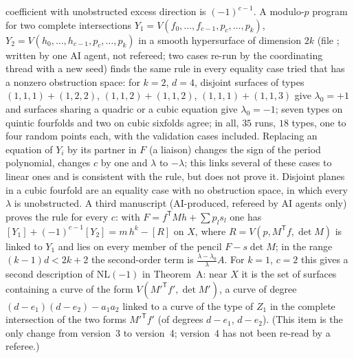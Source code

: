 \documentclass[11pt]{article}
\numberwithin{equation}{section}
\theoremstyle{remark}
\newcommand{\NL}{\mathrm{NL}}
\begin{document}
\begin{enumerate}[label=\textup{(\arabic*)}]
coefficient with unobstructed excess direction is $(-1)^{c-1}$. A modulo-$p$ program for two complete
intersections $Y_1=V(f_0,\dots,f_{c-1},p_c,\dots,p_k)$, $Y_2=V(h_0,\dots,h_{c-1},p_c,\dots,p_k)$ in a smooth
hypersurface of dimension $2k$ (file ; written by one AI agent, not refereed; two
cases re-run by the coordinating thread with a new seed) finds the same rule in every equality case tried that
has a nonzero obstruction space: for $k=2$, $d=4$, disjoint surfaces of types $(1,1,1)+(1,2,2)$,
$(1,1,2)+(1,1,2)$, $(1,1,1)+(1,1,3)$ give $\lambda_0=+1$ and surfaces sharing a quadric or a cubic equation give
$\lambda_0=-1$; seven types on quintic fourfolds and two on cubic sixfolds agree; in all, $35$ runs, $18$ types,
one to four random points each, with the validation cases included. Replacing an equation of $Y_i$ by its
partner in $F$ (a liaison) changes the sign of the period polynomial, changes $c$ by one and $\lambda$ to
$-\lambda$; this links several of these cases to linear ones and is consistent with the rule, but does not prove
it. Disjoint planes in a cubic fourfold are an equality case with no obstruction space, in which every $\lambda$
is unobstructed. A third manuscript \cite{P3} (AI-produced, refereed by AI agents only) proves the rule for
every $c$: with $F=f^{\mathsf T}Mh+\sum p_ls_l$ one has $[Y_1]+(-1)^{c-1}[Y_2]=m\,h^k-[R]$ on $X$, where
$R=V(p,M^{\mathsf T}f,\det M)$ is linked to $Y_1$ and lies on every member of the pencil $F-s\det M$; in the
range $(k-1)d<2k+2$ the second-order term is $\frac{\lambda-\lambda_0}{\lambda}A$. For $k=1$, $c=2$ this gives a
second description of $\NL(-1)$ in Theorem~A: near $X$ it is the set of surfaces containing a curve of the
form $V(M'^{\mathsf T}f',\det M')$, a curve of degree $(d-e_1)(d-e_2)-a_1a_2$ linked to a curve of the type of $Z_1$
in the complete intersection of the two forms $M'^{\mathsf T}f'$ (of degrees $d-e_1$, $d-e_2$). (This
item is the only change from version~3 to version~4; version~4 has not been re-read by a referee.)
\end{enumerate}
\end{document}
